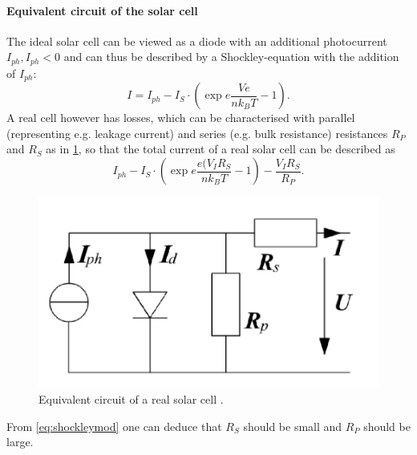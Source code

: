 \documentclass[english,  %
parskip=full,  %
headsepline]{scrartcl}
\begin{document}
\paragraph{Equivalent circuit of the solar cell}
The ideal solar cell can be viewed as a diode with an additional photocurrent $I_{ph}, I_{ph}<0$ and can thus be described by a Shockley-equation with the addition of $I_{ph}$:
\begin{equation}
    I=I_{ph}-I_S\cdot\left(\exp{e\frac{Ve}{nk_BT}}-1\right).
\end{equation}
A real cell however has losses, which can be characterised with parallel (representing e.g. leakage current) and series (e.g. bulk resistance) resistances $R_P$ and $R_S$ as in \cref{fig:circuit}, so that the total current of a real solar cell can be described as
\begin{equation}
    I_{ph}-I_S\cdot\left(\exp{e\frac{e(V_IR_S}{nk_BT}}-1\right)-\frac{V_IR_S}{R_P}.\label{eq:shockleymod}
\end{equation}
\begin{figure}[H]
    \centering
    \includegraphics[width=0.6\linewidth]{circuit.jpg}
    \caption{Equivalent circuit of a real solar cell \cite{instructions}.}
    \label{fig:circuit}
\end{figure}
From \cref{eq:shockleymod} one can deduce that $R_S$ should be small and $R_P$ should be large.
\end{document}
